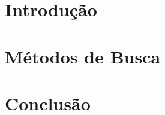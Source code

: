 \documentclass[a4paper,12pt,openany,twoside]{book}
\begin{document}
\singlespacing
{}



\listoffigures
\newpage

\tableofcontents
\newpage

\clearpage
{}
\onehalfspacing      %
\justifying          %

\chapter{Introdução}\label{cap:introducao}


\chapter{Métodos de Busca}\label{cap:metodos}


\chapter{Conclusão}\label{cap:conclusao}


\clearpage



% 

\printindex
\end{document}

